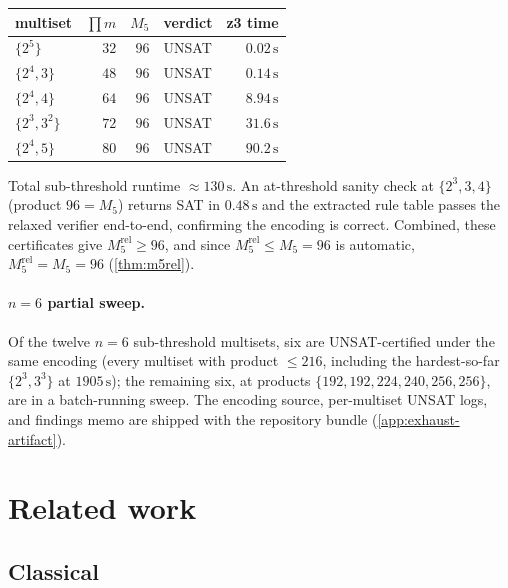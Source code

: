 \documentclass[11pt,a4paper]{article}
\theoremstyle{plain}
\theoremstyle{definition}
\begin{document}
\begin{center}
\begin{tabular}{l r r l r}
\toprule
multiset     & $\prod m$ & $M_5$ & verdict & z3 time\\\midrule
$\{2^5\}$       &  $32$ & $96$ & UNSAT &  $0.02\,\mathrm{s}$\\
$\{2^4, 3\}$    &  $48$ & $96$ & UNSAT &  $0.14\,\mathrm{s}$\\
$\{2^4, 4\}$    &  $64$ & $96$ & UNSAT &  $8.94\,\mathrm{s}$\\
$\{2^3, 3^2\}$  &  $72$ & $96$ & UNSAT & $31.6\,\mathrm{s}$\\
$\{2^4, 5\}$    &  $80$ & $96$ & UNSAT & $90.2\,\mathrm{s}$\\
\bottomrule
\end{tabular}
\end{center}

Total sub-threshold runtime $\approx 130\,\mathrm{s}$.  An
at-threshold sanity check at $\{2^3, 3, 4\}$ (product $96 = M_5$)
returns SAT in $0.48\,\mathrm{s}$ and the extracted rule table
passes the relaxed verifier end-to-end, confirming the encoding is
correct.  Combined, these certificates give $M_5^{\mathrm{rel}} \ge
96$, and since $M_5^{\mathrm{rel}} \le M_5 = 96$ is automatic,
$M_5^{\mathrm{rel}} = M_5 = 96$ (\cref{thm:m5rel}).

\paragraph{$n = 6$ partial sweep.}  Of the twelve $n = 6$
sub-threshold multisets, six are UNSAT-certified under the same
encoding (every multiset with product $\le 216$, including the
hardest-so-far $\{2^3, 3^3\}$ at $1905\,\mathrm{s}$); the remaining
six, at products $\{192, 192, 224, 240, 256, 256\}$, are in a
batch-running sweep.  The encoding source, per-multiset UNSAT logs,
and findings memo are shipped with the repository bundle
(\cref{app:exhaust-artifact}).

\section{Related work}\label{sec:related}

\subsection{Classical}\label{sec:related-classical}
\end{document}
